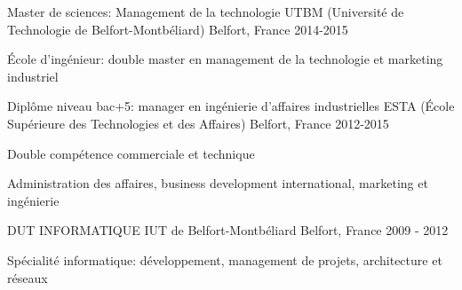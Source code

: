 

\begin{cventries}

  \cventry
    {Master de sciences:  Management de la technologie} %
    {UTBM (Université de Technologie de Belfort-Montbéliard)} %
    {Belfort, France} %
    {2014-2015} %
    {
      \begin{cvitems} %
        \item {École d'ingénieur: double master en management de la technologie et marketing industriel}
      \end{cvitems}
    }
    
  \cventry
    {Diplôme niveau bac+5: manager en ingénierie d'affaires industrielles} %
    {ESTA (École Supérieure des Technologies et des Affaires)} %
    {Belfort, France} %
    {2012-2015} %
    {
      \begin{cvitems} %
        \item {Double compétence commerciale et technique}
        \item {Administration des affaires, business development international, marketing et ingénierie}
      \end{cvitems}
    }

  \cventry
    {DUT INFORMATIQUE} %
    {IUT de Belfort-Montbéliard} %
    {Belfort, France} %
    {2009 - 2012} %
    {
      \begin{cvitems} %
        \item {Spécialité informatique: développement, management de projets, architecture et réseaux}
      \end{cvitems}
    }


\end{cventries}
